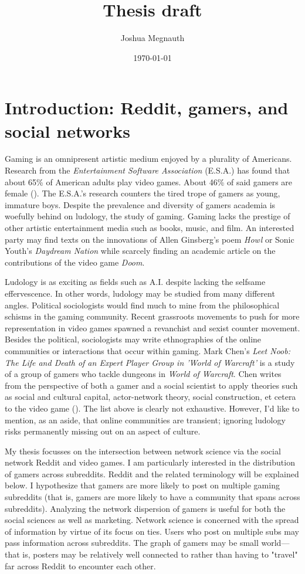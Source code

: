 \documentclass[12pt, a4paper]{article}
\title{Thesis draft}
\author{Joshua Megnauth}
\date{\today}
\begin{document}
\maketitle

\section{Introduction: Reddit, gamers, and social networks}
Gaming is an omnipresent artistic medium enjoyed by a plurality of Americans. Research from the \textit{Entertainment Software Association} (E.S.A.) has found that about 65\% of American adults play video games. About 46\% of said gamers are female (\cite{esagamers}). The E.S.A.'s research counters the tired trope of gamers as young, immature boys. Despite the prevalence and diversity of gamers academia is woefully behind on ludology, the study of gaming. Gaming lacks the prestige of other artistic entertainment media such as books, music, and film. An interested party may find texts on the innovations of Allen Ginsberg's poem \textit{Howl} or Sonic Youth's \textit{Daydream Nation} while scarcely finding an academic article on the contributions of the video game \textit{Doom}. 

Ludology is as exciting as fields such as A.I. despite lacking the selfsame effervescence. In other words, ludology may be studied from many different angles. Political sociologists would find much to mine from the philosophical schisms in the gaming community. Recent grassroots movements to push for more representation in video games spawned a revanchist and sexist counter movement. Besides the political, sociologists may write ethnographies of the online communities or interactions that occur within gaming. Mark Chen's \textit{Leet Noob: The Life and Death of an Expert Player Group in 'World of Warcraft'} is a study of a group of gamers who tackle dungeons in \textit{World of Warcraft}. Chen writes from the perspective of both a gamer and a social scientist to apply theories such as social and cultural capital, actor-network theory, social construction, et cetera to the video game (\cite{chenwow}). The list above is clearly not exhaustive. However, I'd like to mention, as an aside, that online communities are transient; ignoring ludology risks permanently missing out on an aspect of culture.

My thesis focusses on the intersection between network science via the social network Reddit and video games. I am particularly interested in the distribution of gamers across subreddits. Reddit and the related terminology will be explained below. I hypothesize that gamers are more likely to post on multiple gaming subreddits (that is, gamers are more likely to have a community that spans across subreddits). Analyzing the network dispersion of gamers is useful for both the social sciences as well as marketing. Network science is concerned with the spread of information by virtue of its focus on ties. Users who post on multiple subs may pass information across subreddits. The graph of gamers may be small world---that is, posters may be relatively well connected to rather than having to "travel" far across Reddit to encounter each other.
\end{document}
